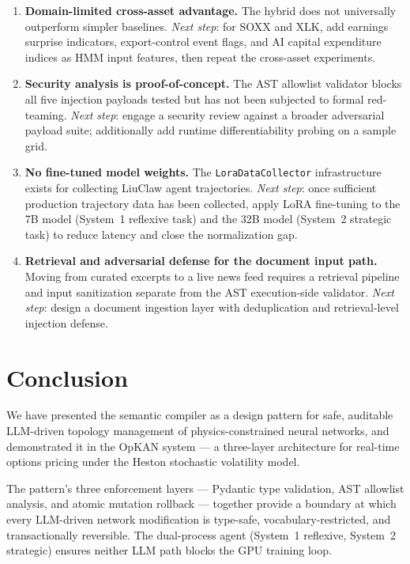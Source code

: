 \documentclass[11pt,a4paper]{article}
\begin{document}
\begin{enumerate}
  \item \textbf{Domain-limited cross-asset advantage.} The hybrid does not universally
  outperform simpler baselines. \emph{Next step}: for SOXX and XLK, add earnings
  surprise indicators, export-control event flags, and AI capital expenditure indices
  as HMM input features, then repeat the cross-asset experiments.

  \item \textbf{Security analysis is proof-of-concept.} The AST allowlist validator
  blocks all five injection payloads tested but has not been subjected to formal
  red-teaming. \emph{Next step}: engage a security review against a broader adversarial
  payload suite; additionally add runtime differentiability probing on a sample grid.

  \item \textbf{No fine-tuned model weights.} The \texttt{LoraDataCollector}
  infrastructure exists for collecting LiuClaw agent trajectories. \emph{Next step}:
  once sufficient production trajectory data has been collected, apply LoRA
  \citep{hu2021lora} fine-tuning to the 7B model (System~1 reflexive task) and the
  32B model (System~2 strategic task) to reduce latency and close the normalization gap.

  \item \textbf{Retrieval and adversarial defense for the document input path.} Moving
  from curated excerpts to a live news feed requires a retrieval pipeline and input
  sanitization separate from the AST execution-side validator. \emph{Next step}:
  design a document ingestion layer with deduplication and retrieval-level injection
  defense.
\end{enumerate}

\section{Conclusion}
\label{sec:conclusion}

We have presented the semantic compiler as a design pattern for safe, auditable
LLM-driven topology management of physics-constrained neural networks, and demonstrated
it in the OpKAN system --- a three-layer architecture for real-time options pricing
under the Heston stochastic volatility model.

The pattern's three enforcement layers --- Pydantic type validation, AST allowlist
analysis, and atomic mutation rollback --- together provide a boundary at which every
LLM-driven network modification is type-safe, vocabulary-restricted, and
transactionally reversible. The dual-process agent (System~1 reflexive, System~2
strategic) ensures neither LLM path blocks the GPU training loop.
\end{document}
